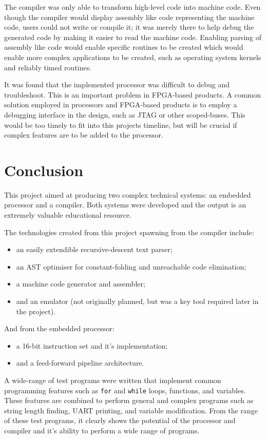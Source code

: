 \documentclass[11pt,a4paper]{report}
\begin{document}
The compiler was only able to transform high-level code into machine code. Even though the compiler would display assembly like code representing the machine code, users could not write or compile it; it was merely there to help debug the generated code by making it easier to read the machine code. Enabling parsing of assembly like code would enable specific routines to be created which would enable more complex applications to be created, such as operating system kernels and reliably timed routines.

It was found that the implemented processor was difficult to debug and troubleshoot. This is an important problem in FPGA-based products. A common solution employed in processors and FPGA-based products is to employ a debugging interface in the design, such as JTAG or other scoped-buses. This would be too timely to fit into this projects timeline, but will be crucial if complex features are to be added to the processor.

\newpage
\section{Conclusion}
This project aimed at producing two complex technical systems: an embedded processor and a compiler. Both systems were developed and the output is an extremely valuable educational resource. 

The technologies created from this project spawning from the compiler include:
\begin{itemize}
\item{an easily extendible recursive-descent text parser;}
\item{an AST optimiser for constant-folding and unreachable code elimination;}
\item{a machine code generator and assembler;}
\item{and an emulator (not originally planned, but was a key tool required later in the project).}
\end{itemize}
And from the embedded processor:
\begin{itemize}
\item{a 16-bit instruction set and it's implementation;}
\item{and a feed-forward pipeline architecture.}
\end{itemize}

A wide-range of test programs were written that implement common programming features such as \verb|for| and \verb|while| loops, functions, and variables. These features are combined to perform general and complex programs such as string length finding, UART printing, and variable modification. From the range of these test programs, it clearly shows the potential of the processor and compiler and it's ability to perform a wide range of programs. 
\end{document}
